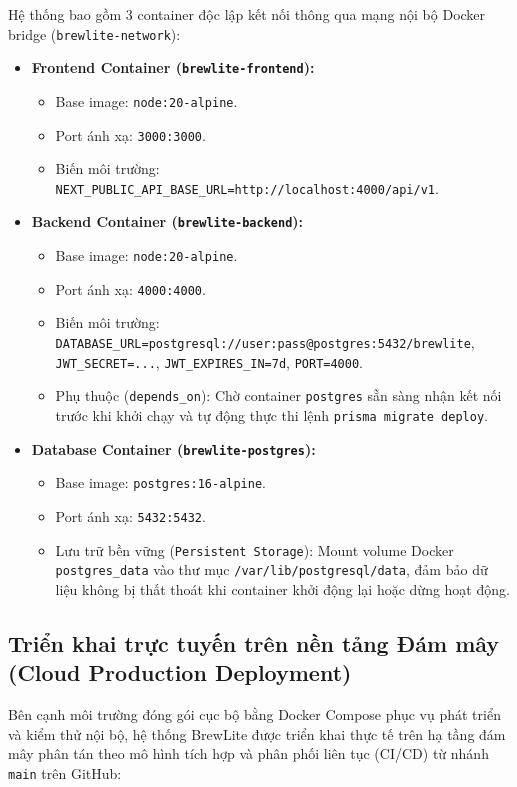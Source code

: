 Hệ thống bao gồm 3 container độc lập kết nối thông qua mạng nội bộ Docker bridge (\texttt{brewlite-network}):
\begin{itemize}
    \item \textbf{Frontend Container (\texttt{brewlite-frontend}):}
    \begin{itemize}
        \item Base image: \texttt{node:20-alpine}.
        \item Port ánh xạ: \texttt{3000:3000}.
        \item Biến môi trường: \texttt{NEXT\_PUBLIC\_API\_BASE\_URL=http://localhost:4000/api/v1}.
    \end{itemize}
    \item \textbf{Backend Container (\texttt{brewlite-backend}):}
    \begin{itemize}
        \item Base image: \texttt{node:20-alpine}.
        \item Port ánh xạ: \texttt{4000:4000}.
        \item Biến môi trường: \texttt{DATABASE\_URL=postgresql://user:pass@postgres:5432/brewlite}, \texttt{JWT\_SECRET=...}, \texttt{JWT\_EXPIRES\_IN=7d}, \texttt{PORT=4000}.
        \item Phụ thuộc (\texttt{depends\_on}): Chờ container \texttt{postgres} sẵn sàng nhận kết nối trước khi khởi chạy và tự động thực thi lệnh \texttt{prisma migrate deploy}.
    \end{itemize}
    \item \textbf{Database Container (\texttt{brewlite-postgres}):}
    \begin{itemize}
        \item Base image: \texttt{postgres:16-alpine}.
        \item Port ánh xạ: \texttt{5432:5432}.
        \item Lưu trữ bền vững (\texttt{Persistent Storage}): Mount volume Docker \texttt{postgres\_data} vào thư mục \texttt{/var/lib/postgresql/data}, đảm bảo dữ liệu không bị thất thoát khi container khởi động lại hoặc dừng hoạt động.
    \end{itemize}
\end{itemize}

\subsection{Triển khai trực tuyến trên nền tảng Đám mây (Cloud Production Deployment)}
Bên cạnh môi trường đóng gói cục bộ bằng Docker Compose phục vụ phát triển và kiểm thử nội bộ, hệ thống BrewLite được triển khai thực tế trên hạ tầng đám mây phân tán theo mô hình tích hợp và phân phối liên tục (CI/CD) từ nhánh \texttt{main} trên GitHub:

